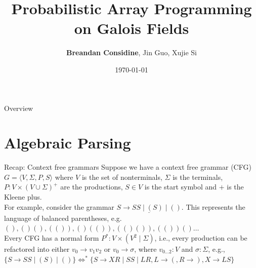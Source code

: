 \documentclass{beamer}
\title[Probabilistic Array Programming on $\mathbb{F}_2^n$]{Probabilistic Array Programming on Galois Fields}
\author[Considine, Guo, Si]{\textbf{Breandan Considine}, Jin Guo, Xujie Si}
\institute[McGill]{
    McGill University, Mila IQIA\\
    \medskip
    \textit{breandan.considine@mail.mcgill.ca}
}
\date{\today}
\begin{document}
    \begin{frame}
        \titlepage
    \end{frame}

    \begin{frame}{Overview}
        \tableofcontents
    \end{frame}

    
    \section{Algebraic Parsing}\label{sec:algebraic-parsing}


    \begin{frame}{Recap: Context free grammars}
        Suppose we have a context free grammar (CFG) $G = \langle V, \Sigma, P, S\rangle$ where $V$ is the set of nonterminals, $\Sigma$ is the terminals, $P: V\times (V \cup \Sigma)^+$ are the productions, $S\in V$ is the start symbol and $+$ is the Kleene plus.\newline\\
        For example, consider the grammar $\underline{S \rightarrow S S \mid ( S ) \mid ()}$. This represents the language of balanced parentheses, e.g. $(), ()(), (()), ()(()), (()()), (())()\ldots$\newline\\
        Every CFG has a normal form $P^*: V \times (V^2 \mid \Sigma)$, i.e., every production can be refactored into either $v_0 \rightarrow v_1 v_2$ or $v_0 \rightarrow \sigma$, where $v_{0\ldots2}: V$ and $\sigma: \Sigma$, e.g., $\{S \rightarrow S S \mid ( S ) \mid ()\}\Leftrightarrow^*\{S\rightarrow XR \mid SS \mid LR, L \rightarrow (, R \rightarrow ), X\rightarrow LS\}$


\end{frame}
\end{document}
